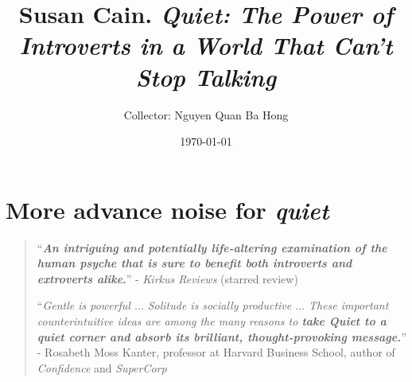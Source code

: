 \documentclass[oneside]{article}
\title{Susan Cain. \textit{Quiet: The Power of Introverts in a World That Can't Stop Talking}}
\author{Collector: Nguyen Quan Ba Hong}
\date{\today}
\numberwithin{equation}{section}
\begin{document}
\maketitle
\setcounter{secnumdepth}{6}
\setcounter{tocdepth}{6}
\tableofcontents


\section*{More advance noise for \textit{quiet}}
\begin{quotation}
    ``\textbf{\textit{An intriguing and potentially life-altering examination of the human psyche that is sure to benefit both introverts and extroverts alike}.}'' - \textit{Kirkus Reviews} (starred review)

    ``\textit{Gentle is powerful $\ldots$ Solitude is socially productive $\ldots$ These important counterintuitive ideas are among the many reasons to \textbf{take \emph{Quiet} to a quiet corner and absorb its brilliant, thought-provoking message.}}'' - Rosabeth Moss Kanter, professor at Harvard Business School, author of \textit{Confidence} and \textit{SuperCorp}
\end{quotation}
\end{document}
